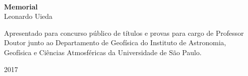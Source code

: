 \begin{titlepage}
    \begin{center}
        \hspace{\fill}
        \\[6cm]

        {\Huge \textbf{Memorial}}
        \\[3cm]

        {\Large Leonardo Uieda}
        \\[3cm]

        \begin{flushright}
        \parbox{9cm}{\large
            Apresentado para concurso público de títulos e provas para cargo de
            Professor Doutor junto ao Departamento de Geofísica do Instituto de
            Astronomia, Geofísica e Ciências Atmosféricas da Universidade de
            São Paulo.
        }
        \end{flushright}
        \vfill

        {\large 2017}
    \end{center}
\end{titlepage}


